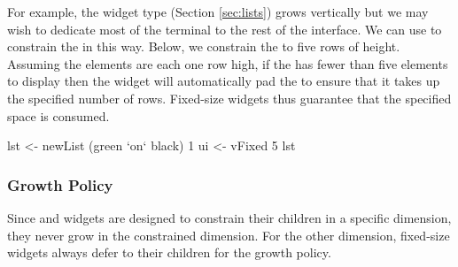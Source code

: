For example, the  widget type (Section \ref{sec:lists}) grows
vertically but we may wish to dedicate most of the terminal to the
rest of the interface.  We can use  to constrain the
 in this way.  Below, we constrain the  to five rows
of height.  Assuming the  elements are each one row high, if
the  has fewer than five elements to display then the
 widget will automatically pad the  to ensure that
it takes up the specified number of rows.  Fixed-size widgets thus
guarantee that the specified space is consumed.

\begin{haskellcode}
 lst <- newList (green `on` black) 1
 ui <- vFixed 5 lst
\end{haskellcode}

\subsubsection{Growth Policy}

Since  and  widgets are designed to constrain
their children in a specific dimension, they never grow in the
constrained dimension.  For the other dimension, fixed-size widgets
always defer to their children for the growth policy.
